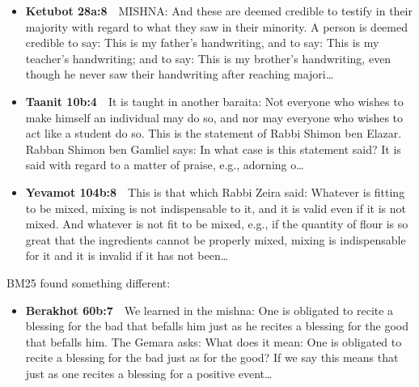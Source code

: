 \documentclass[11pt,a4paper]{article}
\begin{document}
\begin{itemize}[leftmargin=1.2em,itemsep=3pt]
\item {\color{ref}\textbf{Ketubot 28a:8}}\ \ MISHNA: And these are deemed credible to testify in their majority with regard to what they saw in their minority. A person is deemed credible to say: This is my father’s handwriting, and to say: This is my teacher’s handwriting; and to say: This is my brother’s handwriting, even though he never saw their handwriting after reaching majori\ldots
\item {\color{ref}\textbf{Taanit 10b:4}}\ \ It is taught in another baraita: Not everyone who wishes to make himself an individual may do so, and nor may everyone who wishes to act like a student do so. This is the statement of Rabbi Shimon ben Elazar. Rabban Shimon ben Gamliel says: In what case is this statement said? It is said with regard to a matter of praise, e.g., adorning o\ldots
\item {\color{ref}\textbf{Yevamot 104b:8}}\ \ This is that which Rabbi Zeira said: Whatever is fitting to be mixed, mixing is not indispensable to it, and it is valid even if it is not mixed. And whatever is not fit to be mixed, e.g., if the quantity of flour is so great that the ingredients cannot be properly mixed, mixing is indispensable for it and it is invalid if it has not been\ldots
\end{itemize}
{\color{quiet}\small BM25 found something different:}
\begin{itemize}[leftmargin=1.2em]
\item {\color{ref}\textbf{Berakhot 60b:7}}\ \ We learned in the mishna: One is obligated to recite a blessing for the bad that befalls him just as he recites a blessing for the good that befalls him. The Gemara asks: What does it mean: One is obligated to recite a blessing for the bad just as for the good? If we say this means that just as one recites a blessing for a positive event\ldots
\end{itemize}
\end{document}
